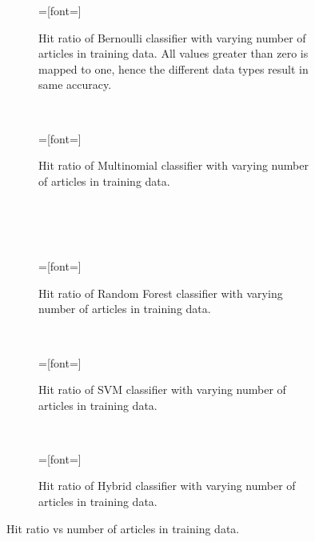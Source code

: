 \setlength{}
\setlength{}
\begin{figure}[H]
	\centering
	\begin{subfigure}[b]{\figwidth}
		=[font=\scriptsize]
		
		\caption{Hit ratio of Bernoulli classifier with varying number of articles in training data. All values greater than zero is mapped to one, hence the different data types result in same accuracy.}
		\label{fig:hitratio-data-nb}
	\end{subfigure}
	~
	\begin{subfigure}[b]{\figwidth}
		=[font=\scriptsize]
		
		\caption{Hit ratio of Multinomial classifier with varying number of articles in training data.\\\ \\\ }
		\label{fig:hitratio-data-mn}
	\end{subfigure}
	\\
	\begin{subfigure}[b]{\figwidth}
		=[font=\scriptsize]
		
		\caption{Hit ratio of Random Forest classifier with varying number of articles in training data.}
		\label{fig:hitratio-data-rf}
	\end{subfigure}
	~
	\begin{subfigure}[b]{\figwidth}
		=[font=\scriptsize]
		
		\caption{Hit ratio of SVM classifier with varying number of articles in training data.}
		\label{fig:hitratio-data-svm}
	\end{subfigure}
	\\
	\begin{subfigure}[b]{\figwidth}
		=[font=\scriptsize]
		
		\caption{Hit ratio of Hybrid classifier with varying number of articles in training data.}
		\label{fig:hitratio-data-hybrid}
	\end{subfigure}
	\caption{Hit ratio vs number of articles in training data.}
	\label{fig:hitratio}
\end{figure}